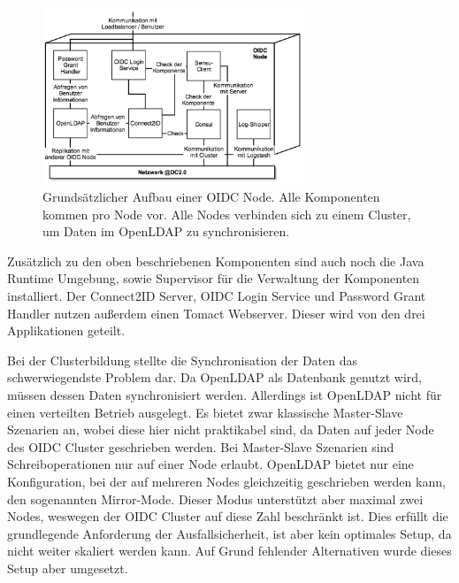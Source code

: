\begin{figure}[ht]
	\centering
	\includegraphics[width=0.7\textwidth]{img/oidc_node.png}
	\caption[Aufbau einer OIDC Node]{Grundsätzlicher Aufbau einer OIDC Node. Alle Komponenten kommen pro Node vor. Alle Nodes verbinden sich zu einem Cluster, um Daten im OpenLDAP zu synchronisieren.}
	\label{fig:oidc}
\end{figure} 

Zusätzlich zu den oben beschriebenen Komponenten sind auch noch die Java Runtime Umgebung, sowie Supervisor für die Verwaltung der Komponenten installiert. Der Connect2ID Server, OIDC Login Service und Password Grant Handler nutzen außerdem einen Tomact Webserver. Dieser wird von den drei Applikationen geteilt.

Bei der Clusterbildung stellte die Synchronisation der Daten das schwerwiegendste Problem dar. Da OpenLDAP als Datenbank genutzt wird, müssen dessen Daten synchronisiert werden. Allerdings ist OpenLDAP nicht für einen verteilten Betrieb ausgelegt. Es bietet zwar klassische Master-Slave Szenarien an, wobei diese hier nicht praktikabel sind, da Daten auf jeder Node des OIDC Cluster geschrieben werden. Bei Master-Slave Szenarien sind Schreiboperationen nur auf einer Node erlaubt. OpenLDAP bietet nur eine Konfiguration, bei der auf mehreren Nodes gleichzeitig geschrieben werden kann, den sogenannten Mirror-Mode. Dieser Modus unterstützt aber maximal zwei Nodes, weswegen der OIDC Cluster auf diese Zahl beschränkt ist. Dies erfüllt die grundlegende Anforderung der Ausfallsicherheit, ist aber kein optimales Setup, da nicht weiter skaliert werden kann. Auf Grund fehlender Alternativen wurde dieses Setup aber umgesetzt.

